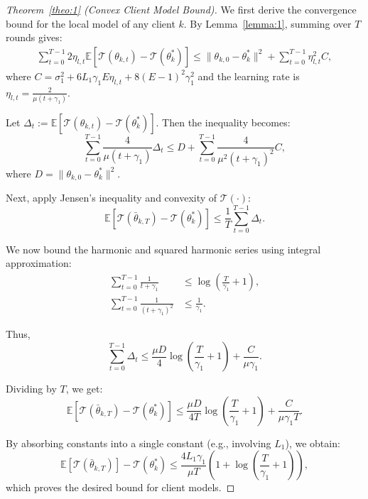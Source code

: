 \documentclass[lettersize,journal]{IEEEtran}
\newtheorem{proof}{Proof}
\begin{document}
\begin{proof}[Theorem~\ref{theo:1} (Convex Client Model Bound)]
We first derive the convergence bound for the local model of any client $k$. By Lemma~\ref{lemma:1}, summing over $T$ rounds gives:
\begin{equation}
\begin{split}
    \sum_{t=0}^{T-1} 2\eta_{l,t} \mathbb{E}[\mathcal{T}(\theta_{k,t}) - \mathcal{T}(\theta_k^*)]
    \leq \|\theta_{k,0} - \theta_k^*\|^2 + \sum_{t=0}^{T-1} \eta_{l,t}^2 C,
\end{split}
\end{equation}
where $C = \sigma_1^2 + 6L_1\gamma_1 E\eta_{l,t} + 8(E-1)^2\gamma_1^2$ and the learning rate is $\eta_{l,t} = \frac{2}{\mu(t + \gamma_1)}$.

Let $\Delta_t := \mathbb{E}[\mathcal{T}(\theta_{k,t}) - \mathcal{T}(\theta_k^*)]$. Then the inequality becomes:
\begin{equation}
\sum_{t=0}^{T-1} \frac{4}{\mu(t + \gamma_1)} \Delta_t \leq D + \sum_{t=0}^{T-1} \frac{4}{\mu^2(t + \gamma_1)^2} C,
\end{equation}
where $D = \|\theta_{k,0} - \theta_k^*\|^2$.

Next, apply Jensen’s inequality and convexity of $\mathcal{T}(\cdot)$:
\begin{equation}
\mathbb{E}[\mathcal{T}(\bar{\theta}_{k,T}) - \mathcal{T}(\theta_k^*)] \leq \frac{1}{T} \sum_{t=0}^{T-1} \Delta_t.
\end{equation}

We now bound the harmonic and squared harmonic series using integral approximation:
\begin{align}
    \sum_{t=0}^{T-1} \frac{1}{t + \gamma_1} &\leq \log\left(\frac{T}{\gamma_1} + 1\right), \\
    \sum_{t=0}^{T-1} \frac{1}{(t + \gamma_1)^2} &\leq \frac{1}{\gamma_1}.
\end{align}

Thus,
\begin{equation}
\sum_{t=0}^{T-1} \Delta_t \leq \frac{\mu D}{4} \log\left(\frac{T}{\gamma_1} + 1\right) + \frac{C}{\mu\gamma_1}.
\end{equation}

Dividing by $T$, we get:
\begin{equation}
\mathbb{E}[\mathcal{T}(\bar{\theta}_{k,T}) - \mathcal{T}(\theta_k^*)]
\leq \frac{\mu D}{4T} \log\left(\frac{T}{\gamma_1} + 1\right) + \frac{C}{\mu \gamma_1 T}.
\end{equation}

By absorbing constants into a single constant (e.g., involving $L_1$), we obtain:
\begin{equation}
\mathbb{E}[\mathcal{T}(\bar{\theta}_{k,T})] - \mathcal{T}(\theta_k^*)
\leq \frac{4L_1\gamma_1}{\mu T} \left(1 + \log\left(\frac{T}{\gamma_1} + 1\right)\right),
\end{equation}
which proves the desired bound for client models.
\end{proof}
\end{document}
